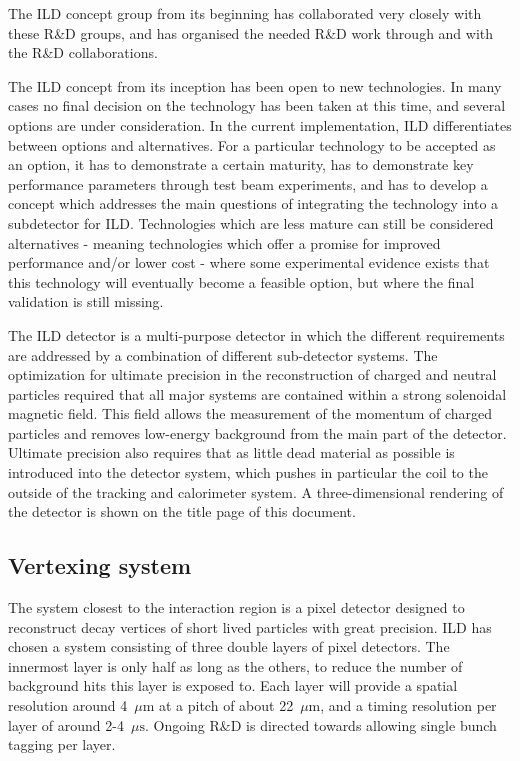 \documentclass[%
 amsmath,amssymb,
 aps,
]{revtex4-1}
\begin{document}
The ILD concept group from its beginning has collaborated very closely with these R\&D groups, and has organised the needed R\&D work through and with the R\&D collaborations. 

The ILD concept from its inception has been open to new technologies. 
In many cases no final decision on the technology has been taken at this time, and several options are under consideration. In the current implementation, ILD differentiates between options and alternatives. 
For a particular technology to be accepted as an option, it has to demonstrate a certain maturity, has to demonstrate key performance parameters through test beam experiments, and has to develop a concept which addresses the main questions of integrating the technology into a subdetector for ILD. Technologies which are less mature can still be considered alternatives - meaning technologies which offer a promise for improved performance and/or lower cost - where some experimental evidence exists that this technology will eventually become a feasible option, but where the final validation is still missing. 

The ILD detector is a multi-purpose detector in which the different requirements are addressed by a combination of different sub-detector systems. The optimization for ultimate precision in the reconstruction of charged and neutral particles required that all major systems are contained within a strong solenoidal magnetic field. This field allows the measurement of the momentum of charged particles and removes low-energy background from the main part of the detector. Ultimate precision also requires that as little dead material as possible is introduced into the detector system, which pushes in particular the coil to the outside of the tracking and calorimeter system. A three-dimensional rendering of the detector is shown on the title page of this document.



\subsection{Vertexing system}
The system closest to the interaction region is a pixel detector designed to reconstruct decay vertices of short lived particles with great precision. ILD has chosen a system consisting of three double layers of pixel detectors. The innermost layer is only half as long as the others, to reduce the number of background hits this layer is exposed to. Each layer will provide a spatial resolution around 4~$\mu$m at a pitch of about 22~$\mu\mathrm{m}$, and a timing resolution per layer of around 2-4~$\mu\mathrm{s}$. Ongoing R\&D is directed towards allowing single bunch tagging per layer. 
\end{document}
